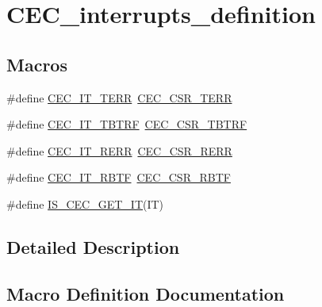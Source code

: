 \hypertarget{group___c_e_c__interrupts__definition}{}\section{C\+E\+C\+\_\+interrupts\+\_\+definition}
\label{group___c_e_c__interrupts__definition}
\subsection*{Macros}
\begin{DoxyCompactItemize}
\item 
\#define \mbox{\hyperlink{group___c_e_c__interrupts__definition_ga25f97d245f29e04a2d2bbc840389e6b5}{C\+E\+C\+\_\+\+I\+T\+\_\+\+T\+E\+RR}}~\mbox{\hyperlink{group___peripheral___registers___bits___definition_ga273caacb035cb2ec64c721fa6c747c35}{C\+E\+C\+\_\+\+C\+S\+R\+\_\+\+T\+E\+RR}}
\item 
\#define \mbox{\hyperlink{group___c_e_c__interrupts__definition_ga12b00fb3989f9ce9f2f7fc0094c0747d}{C\+E\+C\+\_\+\+I\+T\+\_\+\+T\+B\+T\+RF}}~\mbox{\hyperlink{group___peripheral___registers___bits___definition_ga650bba50140fa01d98abe80bf004a9b6}{C\+E\+C\+\_\+\+C\+S\+R\+\_\+\+T\+B\+T\+RF}}
\item 
\#define \mbox{\hyperlink{group___c_e_c__interrupts__definition_gac015ebba728a69eeb84be1bc56a58ac0}{C\+E\+C\+\_\+\+I\+T\+\_\+\+R\+E\+RR}}~\mbox{\hyperlink{group___peripheral___registers___bits___definition_ga2e33f1d4724efa45fce87ae2fcba6cff}{C\+E\+C\+\_\+\+C\+S\+R\+\_\+\+R\+E\+RR}}
\item 
\#define \mbox{\hyperlink{group___c_e_c__interrupts__definition_ga42834131bf077a878e84470ae98f1bb4}{C\+E\+C\+\_\+\+I\+T\+\_\+\+R\+B\+TF}}~\mbox{\hyperlink{group___peripheral___registers___bits___definition_gaa325807f8f3d4bdf8e989eeef208ca5a}{C\+E\+C\+\_\+\+C\+S\+R\+\_\+\+R\+B\+TF}}
\item 
\#define \mbox{\hyperlink{group___c_e_c__interrupts__definition_ga7f553a4a3346c676101d81a024a9cba8}{I\+S\+\_\+\+C\+E\+C\+\_\+\+G\+E\+T\+\_\+\+IT}}(IT)
\end{DoxyCompactItemize}


\subsection{Detailed Description}


\subsection{Macro Definition Documentation}
\mbox{\label{group___c_e_c__interrupts__definition_ga42834131bf077a878e84470ae98f1bb4}} 
